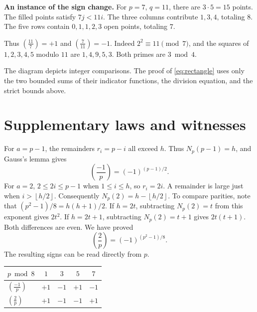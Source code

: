 \documentclass[12pt,letterpaper]{article}
\newcommand{\sect}[1]{\section{\texorpdfstring{\color{accent}#1}{#1}}}
\newcommand{\lab}[1]{\textbf{#1.}\enspace}
\newcommand{\leg}[2]{\left(\frac{#1}{#2}\right)}
\newcommand{\floor}[1]{\left\lfloor#1\right\rfloor}
\begin{document}
\vspace{5pt}
\begin{minipage}[c]{.42\linewidth}\centering
{}
\end{minipage}\hfill
\begin{minipage}[c]{.54\linewidth}
\lab{An instance of the sign change} For $p=7$, $q=11$, there are $3\cdot5=15$ points. The filled points satisfy $7j<11i$. The three columns contribute $1,3,4$, totaling $8$. The five rows contain $0,1,1,2,3$ open points, totaling $7$.

Thus $\leg{11}{7}=+1$ and $\leg{7}{11}=-1$. Indeed $2^2\equiv11\pmod7$, and the squares of $1,2,3,4,5$ modulo $11$ are $1,4,9,5,3$. Both primes are $3\bmod4$.
\end{minipage}

\vspace{7pt}
The diagram depicts integer comparisons. The proof of \eqref{eq:rectangle} uses only the two bounded sums of their indicator functions, the division equation, and the strict bounds above.
\clearpage
\sect{Supplementary laws and witnesses}\label{sec:supp}
For $a=p-1$, the remainders $r_i=p-i$ all exceed $h$. Thus $N_p(p-1)=h$, and Gauss's lemma gives
\begin{equation}\label{eq:minusone}
                 \leg{-1}{p}=(-1)^{(p-1)/2}.
\end{equation}
For $a=2$, $2\le 2i\le p-1$ when $1\le i\le h$, so $r_i=2i$. A remainder is large just when $i>\floor{h/2}$. Consequently $N_p(2)=h-\floor{h/2}$. To compare parities, note that $(p^2-1)/8=h(h+1)/2$. If $h=2t$, subtracting $N_p(2)=t$ from this exponent gives $2t^2$. If $h=2t+1$, subtracting $N_p(2)=t+1$ gives $2t(t+1)$. Both differences are even. We have proved
\begin{equation}\label{eq:two}
                    \leg{2}{p}=(-1)^{(p^2-1)/8}.
\end{equation}
The resulting signs can be read directly from $p$.
\begin{center}
\begin{tabular}{@{}lcccc@{}}\toprule
$p\bmod 8$ & $1$ & $3$ & $5$ & $7$\\\midrule
$\leg{-1}{p}$ & $+1$ & $-1$ & $+1$ & $-1$\\[3pt]
$\leg{2}{p}$ & $+1$ & $-1$ & $-1$ & $+1$\\\bottomrule
\end{tabular}
\end{center}
\end{document}
